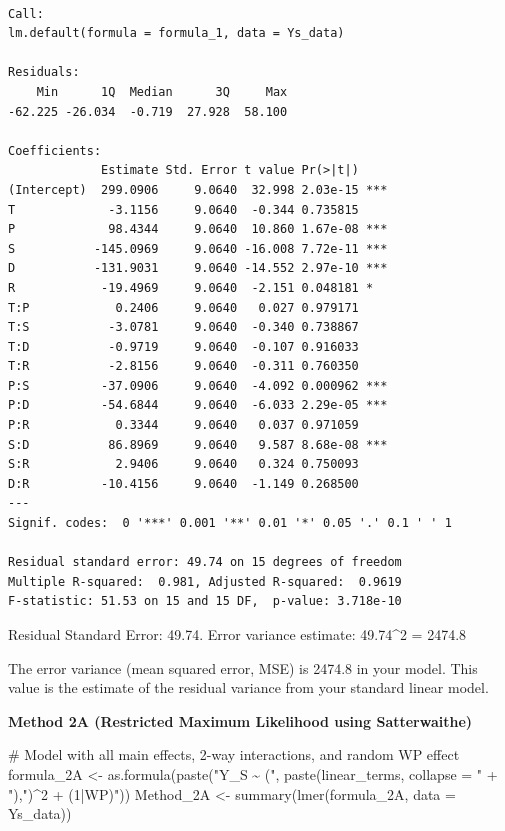 \documentclass[
  letterpaper,
  DIV=11,
  numbers=noendperiod]{scrartcl}
\newenvironment{Shaded}{\begin{snugshade}}{\end{snugshade}}
\newcommand{\AttributeTok}[1]{\textcolor[rgb]{0.40,0.45,0.13}{#1}}
\newcommand{\CommentTok}[1]{\textcolor[rgb]{0.37,0.37,0.37}{#1}}
\newcommand{\FunctionTok}[1]{\textcolor[rgb]{0.28,0.35,0.67}{#1}}
\newcommand{\NormalTok}[1]{\textcolor[rgb]{0.00,0.23,0.31}{#1}}
\newcommand{\OtherTok}[1]{\textcolor[rgb]{0.00,0.23,0.31}{#1}}
\newcommand{\StringTok}[1]{\textcolor[rgb]{0.13,0.47,0.30}{#1}}
\begin{document}
\begin{verbatim}

Call:
lm.default(formula = formula_1, data = Ys_data)

Residuals:
    Min      1Q  Median      3Q     Max 
-62.225 -26.034  -0.719  27.928  58.100 

Coefficients:
             Estimate Std. Error t value Pr(>|t|)    
(Intercept)  299.0906     9.0640  32.998 2.03e-15 ***
T             -3.1156     9.0640  -0.344 0.735815    
P             98.4344     9.0640  10.860 1.67e-08 ***
S           -145.0969     9.0640 -16.008 7.72e-11 ***
D           -131.9031     9.0640 -14.552 2.97e-10 ***
R            -19.4969     9.0640  -2.151 0.048181 *  
T:P            0.2406     9.0640   0.027 0.979171    
T:S           -3.0781     9.0640  -0.340 0.738867    
T:D           -0.9719     9.0640  -0.107 0.916033    
T:R           -2.8156     9.0640  -0.311 0.760350    
P:S          -37.0906     9.0640  -4.092 0.000962 ***
P:D          -54.6844     9.0640  -6.033 2.29e-05 ***
P:R            0.3344     9.0640   0.037 0.971059    
S:D           86.8969     9.0640   9.587 8.68e-08 ***
S:R            2.9406     9.0640   0.324 0.750093    
D:R          -10.4156     9.0640  -1.149 0.268500    
---
Signif. codes:  0 '***' 0.001 '**' 0.01 '*' 0.05 '.' 0.1 ' ' 1

Residual standard error: 49.74 on 15 degrees of freedom
Multiple R-squared:  0.981, Adjusted R-squared:  0.9619 
F-statistic: 51.53 on 15 and 15 DF,  p-value: 3.718e-10
\end{verbatim}

Residual Standard Error: 49.74. Error variance estimate: 49.74\^{}2 =
2474.8

The error variance (mean squared error, MSE) is 2474.8 in your model.
This value is the estimate of the residual variance from your standard
linear model.

\textbf{Method 2A (Restricted Maximum Likelihood using Satterwaithe)}

\begin{Shaded}
\begin{Highlighting}[]
\CommentTok{\# Model with all main effects, 2{-}way interactions, and random WP effect}
\NormalTok{formula\_2A }\OtherTok{\textless{}{-}} \FunctionTok{as.formula}\NormalTok{(}\FunctionTok{paste}\NormalTok{(}\StringTok{"Y\_S \textasciitilde{} ("}\NormalTok{, }
    \FunctionTok{paste}\NormalTok{(linear\_terms, }\AttributeTok{collapse =} \StringTok{" + "}\NormalTok{),}\StringTok{")\^{}2 + (1|WP)"}\NormalTok{))}
\NormalTok{Method\_2A }\OtherTok{\textless{}{-}} \FunctionTok{summary}\NormalTok{(}\FunctionTok{lmer}\NormalTok{(formula\_2A, }\AttributeTok{data =}\NormalTok{ Ys\_data))}
\end{Highlighting}
\end{Shaded}
\end{document}
